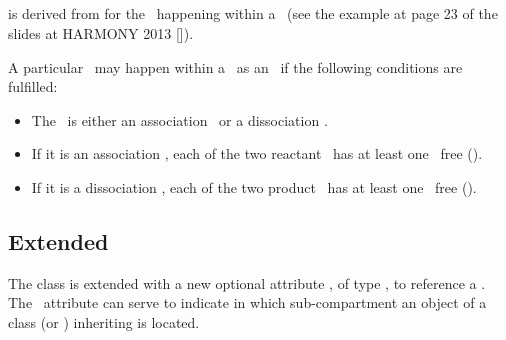 \subsection{}
\label{def:IntraSpeciesReaction}

 is derived from  for the \reactions\ happening within a \species\ (see the example  at page 23  of the slides at HARMONY 2013 [\cite{ref:harmony2013}]).

A particular \reaction\ may happen within a \species\ as an \intraSpeciesReaction\ if the following conditions are fulfilled:
\begin{itemize}
 \item The \reaction\ is either an association \reaction\ or a dissociation \reaction.
 \item If it is an association \reaction, each of the two reactant \species\ has at least one \outwardBindingSite\ free ().
 \item If it is a dissociation \reaction, each of the two product \species\ has at least one \outwardBindingSite\ free ().
\end{itemize}

\label{Note:IntraSpeciesReaction}

\clearpage

\subsection{Extended }
\label{def:ExSimpleSpeciesReference}

The \SimpleSpeciesReference class is extended with a new optional attribute \compartmentReferenceAtt, of type \SIdRefPT, to reference a \compartmentReference.  The \compartmentReferenceAtt\ attribute can serve to indicate in which sub-compartment an object of a class (\SpeciesReference or
\ModifierSpeciesReference) inheriting \ExSimpleSpeciesReference is located.

